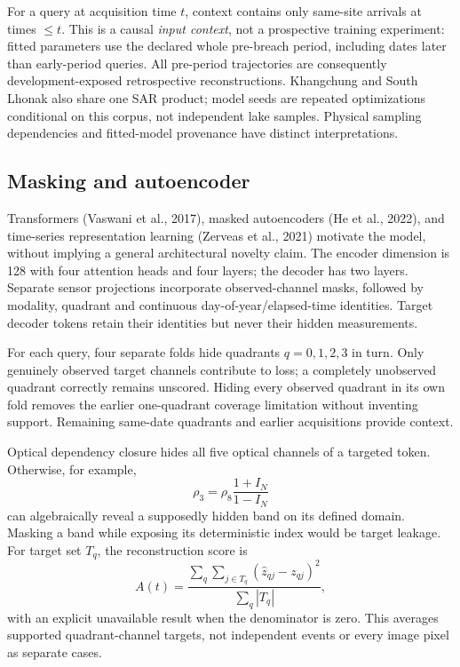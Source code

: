 \documentclass[10pt,twocolumn]{article}
\begin{document}
For a query at acquisition time $t$, context contains only same-site arrivals at times $\leq t$. This is a causal \emph{input context}, not a prospective training experiment: fitted parameters use the declared whole pre-breach period, including dates later than early-period queries. All pre-period trajectories are consequently development-exposed retrospective reconstructions. Khangchung and South Lhonak also share one SAR product; model seeds are repeated optimizations conditional on this corpus, not independent lake samples. Physical sampling dependencies and fitted-model provenance have distinct interpretations.

\subsection{Masking and autoencoder}
Transformers (Vaswani et al., 2017), masked autoencoders (He et al., 2022), and time-series representation learning (Zerveas et al., 2021) motivate the model, without implying a general architectural novelty claim. The encoder dimension is 128 with four attention heads and four layers; the decoder has two layers. Separate sensor projections incorporate observed-channel masks, followed by modality, quadrant and continuous day-of-year/elapsed-time identities. Target decoder tokens retain their identities but never their hidden measurements.

For each query, four separate folds hide quadrants $q=0,1,2,3$ in turn. Only genuinely observed target channels contribute to loss; a completely unobserved quadrant correctly remains unscored. Hiding every observed quadrant in its own fold removes the earlier one-quadrant coverage limitation without inventing support. Remaining same-date quadrants and earlier acquisitions provide context.

Optical dependency closure hides all five optical channels of a targeted token. Otherwise, for example,
\begin{equation}
 \rho_3=\rho_8\frac{1+I_N}{1-I_N}
\end{equation}
can algebraically reveal a supposedly hidden band on its defined domain. Masking a band while exposing its deterministic index would be target leakage. For target set $T_q$, the reconstruction score is
\begin{equation}
 A(t)=\frac{\sum_q\sum_{j\in T_q}(\hat z_{qj}-z_{qj})^2}{\sum_q |T_q|},
\end{equation}
with an explicit unavailable result when the denominator is zero. This averages supported quadrant-channel targets, not independent events or every image pixel as separate cases.
\end{document}
